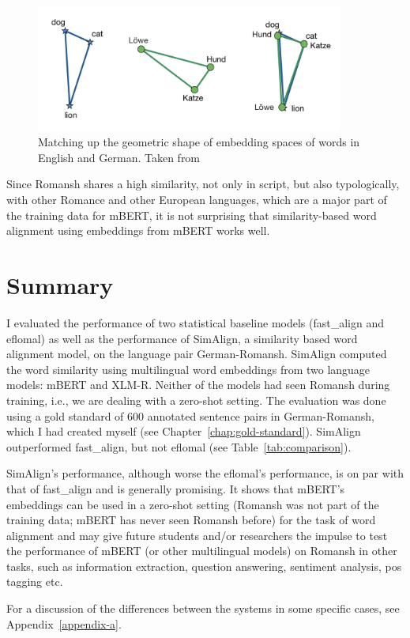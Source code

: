 \begin{figure}[ht]
\centering
\includegraphics[width=0.9\textwidth]{graphics/embedding-alignment.png}
\caption{Matching up the geometric shape of embedding spaces of words in English and German. 
Taken from \cite[223]{koehn-2020}}
\label{fig:embedding-alignment}
\end{figure}



Since Romansh shares a high similarity, not only in script, but also typologically, with other Romance and other European languages, which are a major part of the training data for mBERT, it is not surprising that similarity-based word alignment using embeddings from mBERT works well.





 
\section{Summary}
I evaluated the performance of  two statistical baseline models (fast\_align and eflomal)  as well as the performance of SimAlign, a similarity based word alignment model, on the language pair German-Romansh. 
SimAlign computed the word similarity using multilingual word embeddings from two language models: mBERT and XLM-R. Neither of the models had seen Romansh during training, i.e., we are dealing with a zero-shot setting.
The evaluation was done using a gold standard of 600 annotated sentence pairs in German-Romansh, which I had created myself (see Chapter~\ref{chap:gold-standard}).
SimAlign outperformed fast\_align, but not eflomal (see Table~\ref{tab:comparison}). 

SimAlign's performance, although worse the eflomal's performance, is on par with that of fast\_align and is generally promising. 
It shows that mBERT's embeddings can be used in a zero-shot setting (Romansh was not part of the training data; mBERT has never seen Romansh before) for the task of word alignment and may give future students and/or researchers the impulse to test the performance of mBERT (or other multilingual models) on Romansh in other tasks, such as information extraction, question answering, sentiment analysis, \acrshort{pos} tagging etc.

For a discussion of the differences between the systems in some specific cases, see Appendix~\ref{appendix-a}.




